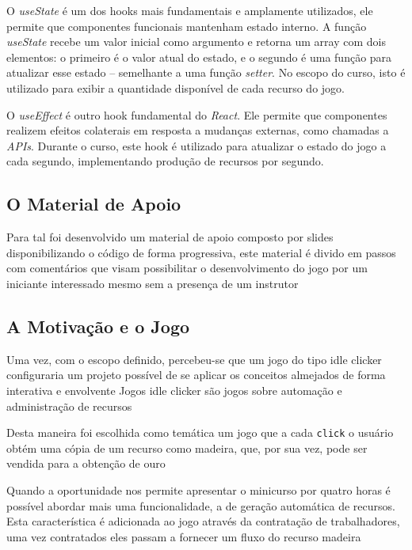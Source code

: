 O \textit{useState} é um dos hooks mais fundamentais e amplamente utilizados, ele permite que componentes funcionais mantenham estado interno. A função \textit{useState} recebe um valor inicial como argumento e retorna um array com dois elementos: o primeiro é o valor atual do estado, e o segundo é uma função para atualizar esse estado -- semelhante a uma função \textit{setter}. No escopo do curso, isto é utilizado para exibir a quantidade disponível de cada recurso do jogo.

O \textit{useEffect} é outro hook fundamental do \textit{React}. Ele permite que componentes realizem efeitos colaterais em resposta a mudanças externas, como chamadas a \textit{APIs}. Durante o curso, este hook é utilizado para atualizar o estado do jogo a cada segundo, implementando produção de recursos por segundo.

\subsection{O Material de Apoio}
Para tal foi desenvolvido um material de apoio composto por slides disponibilizando o código de forma progressiva, este material é divido em passos com comentários que visam possibilitar o desenvolvimento do jogo por um iniciante interessado mesmo sem a presença de um instrutor 

\subsection{A Motivação e o Jogo}
Uma vez, com o escopo definido, percebeu-se que um jogo do tipo idle clicker configuraria um projeto possível de se aplicar os conceitos almejados de forma interativa e envolvente  Jogos idle clicker são jogos sobre automação e administração de recursos 

Desta maneira foi escolhida como temática um jogo que a cada \texttt{click} o usuário obtém uma cópia de um recurso como madeira, que, por sua vez, pode ser vendida para a obtenção de ouro 

Quando a oportunidade nos permite apresentar o minicurso por quatro horas é possível abordar mais uma funcionalidade, a de geração automática de recursos. Esta característica é adicionada ao jogo através da contratação de trabalhadores, uma vez contratados eles passam a fornecer um fluxo do recurso madeira 
